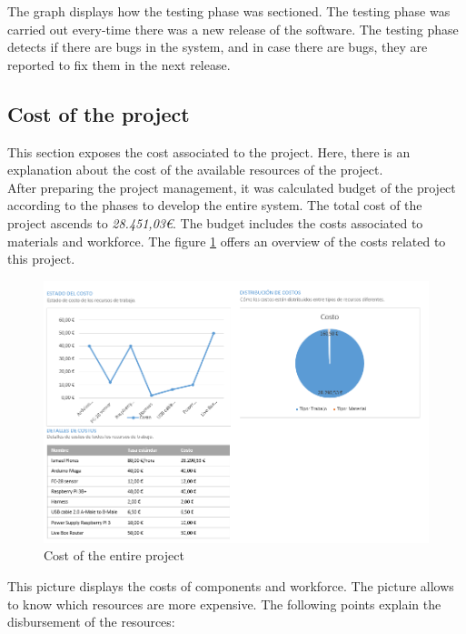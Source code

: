 The graph displays how the testing phase was sectioned. The testing phase was carried out every-time there was a new release of the software. The testing phase detects if there are bugs in the system, and in case there are bugs, they are reported to fix them in the next release.

\subsection{Cost of the project}

This section exposes the cost associated to the project. Here, there is an explanation about the cost of the available resources of the project.\\

After preparing the project management, it was calculated budget of the project according to the phases to develop the entire system. The total cost of the project ascends to \textit{28.451,03\euro}. The budget includes the costs associated to materials and workforce. The figure \ref{Cost of the entire project} offers an overview of the costs related to this project.\\

\begin{figure}[H]
\begin{centering}
\includegraphics[scale=0.65]{IMGS/numbers_project.PNG}
\caption{Cost of the entire project \label{Cost of the entire project}}
\end{centering}
\end{figure}

\newpage

This picture displays the costs of components and workforce. The picture allows to know which resources are more expensive. The following points explain the disbursement of the resources:

